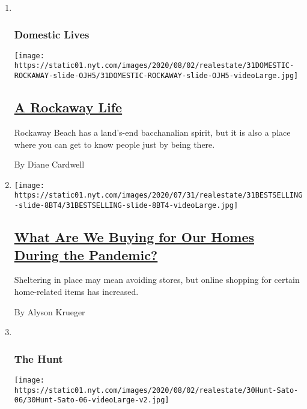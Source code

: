\begin{enumerate}
\def\labelenumi{\arabic{enumi}.}
\item ~
  \hypertarget{domestic-lives}{%
  \subsubsection{Domestic Lives}\label{domestic-lives}}

  \texttt{[image: https://static01.nyt.com/images/2020/08/02/realestate/31DOMESTIC-ROCKAWAY-slide-OJH5/31DOMESTIC-ROCKAWAY-slide-OJH5-videoLarge.jpg]}

  \hypertarget{a-rockaway-life}{%
  \subsection{\texorpdfstring{\href{/2020/07/31/realestate/a-rockaway-beach-queens-life.html}{A
  Rockaway Life}}{A Rockaway Life}}\label{a-rockaway-life}}

  Rockaway Beach has a land's-end bacchanalian spirit, but it is also a
  place where you can get to know people just by being there.

  By Diane Cardwell
\item
  \texttt{[image: https://static01.nyt.com/images/2020/07/31/realestate/31BESTSELLING-slide-8BT4/31BESTSELLING-slide-8BT4-videoLarge.jpg]}

  \hypertarget{what-are-we-buying-for-our-homes-during-the-pandemic}{%
  \subsection{\texorpdfstring{\href{/2020/07/31/realestate/pandemic-shopping-home-design.html}{What
  Are We Buying for Our Homes During the
  Pandemic?}}{What Are We Buying for Our Homes During the Pandemic?}}\label{what-are-we-buying-for-our-homes-during-the-pandemic}}

  Sheltering in place may mean avoiding stores, but online shopping for
  certain home-related items has increased.

  By Alyson Krueger
\item ~
  \hypertarget{the-hunt}{%
  \subsubsection{The Hunt}\label{the-hunt}}

  \texttt{[image: https://static01.nyt.com/images/2020/08/02/realestate/30Hunt-Sato-06/30Hunt-Sato-06-videoLarge-v2.jpg]}


\end{enumerate}
